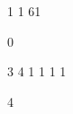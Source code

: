 \begin{myverbbox}[\small]{\vinput}
    1 1
    61
\end{myverbbox}
\begin{myverbbox}[\small]{\voutput}
    0
\end{myverbbox}


\begin{myverbbox}[\small]{\vinput}
    3 4
    1 1 1 1
\end{myverbbox}

\begin{myverbbox}[\small]{\voutput}
    4
\end{myverbbox}

